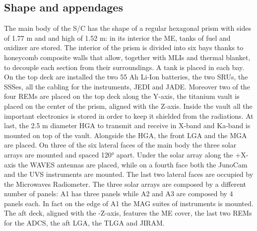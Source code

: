 \subsection{Shape and appendages}
\label{subsec:shape_appendages}


The main body of the S/C has the shape of a regular hexagonal prism with sides of 1.77 m and and high of 1.52 m: in its interior the ME, tanks of fuel and oxidizer are stored. The interior of the prism is divided into six bays thanks to honeycomb composite walls that allow, together with MLIs and thermal blanket, to decouple each section from their surroundings. A tank is placed in each bay. On the top deck are installed the two 55 Ah Li-Ion batteries, the two SRUs, the SSSes, all the cabling for the instruments, JEDI and JADE. Moreover two of the four REMs are placed on the top deck along the Y-axis, the titanium vault is placed on the center of the prism, aligned with the Z-axis. Inside the vault all the important electronics is stored in order to keep it shielded from the radiations. At last, the 2.5 m diameter HGA to transmit and receive in X-band and Ka-band is mounted on top of the vault. Alongside the HGA, the front LGA and the MGA are placed. On three of the six lateral faces of the main body the three solar arrays are mounted and spaced 120° apart. Under the solar array along the +X-axis the WAVES antennas are placed, while on a fourth face both the JunoCam and the UVS instruments are mounted. The last two lateral faces are occupied by the Microwaves Radiometer. The three solar arrays are composed by a different number of panels: A1 has three panels while A2 and A3 are composed by 4 panels each. In fact on the edge of A1 the MAG suites of instruments is mounted. The aft deck, aligned with the -Z-axis, features the ME cover, the last two REMs for the ADCS, the aft LGA, the TLGA and JIRAM.